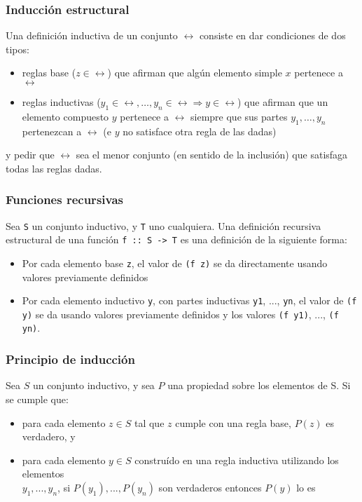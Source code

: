 \documentclass[10pt,a4paper]{article}
\begin{document}
\subsubsection{Inducción estructural}
Una definición inductiva de un conjunto $\rel$ consiste en dar condiciones de dos tipos:
\begin{itemize}
	\item reglas base ($z\in\rel$) que afirman que algún elemento simple $x$ pertenece a $\rel$
	\item reglas inductivas ($y_1\in\rel,\dots,y_n\in\rel\Rightarrow y\in\rel$) que afirman que un elemento compuesto $y$ pertenece a
	$\rel$ siempre que sus partes $y_1,\dots,y_n$ pertenezcan a $\rel$
	(e $y$ no satisface otra regla de las dadas)
\end{itemize}

y pedir que $\rel$ sea el menor conjunto (en sentido de
la inclusión) que satisfaga todas las reglas dadas.

\subsubsection{Funciones recursivas}
Sea \texttt{S} un conjunto inductivo, y \texttt{T} uno cualquiera. Una definición recursiva estructural de una función \texttt{f :: S -> T} es una definición de la siguiente forma:
\begin{itemize}
	\item Por cada elemento base \texttt{z}, el valor de \texttt{(f z)} se da directamente usando valores previamente definidos
	\item Por cada elemento inductivo \texttt{y}, con partes inductivas \texttt{y1}, ..., \texttt{yn}, el valor de \texttt{(f y)} se da usando valores previamente definidos y los valores \texttt{(f y1)}, ..., \texttt{(f yn)}.
\end{itemize}

\subsubsection{Principio de inducción}
Sea $S$ un conjunto inductivo, y sea $P$ una propiedad sobre los elementos de S. Si se cumple que:
\begin{itemize}
	\item para cada elemento $z\in S$ tal que $z$ cumple con una regla base, $P(z)$ es verdadero, y
	\item para cada elemento $y\in S$ construído en una regla inductiva utilizando los elementos \\ $y_1, ..., y_n$, si $P(y_1 ), ..., P(y_n)$ son verdaderos entonces $P(y)$ lo es
	
\end{itemize}
\end{document}

